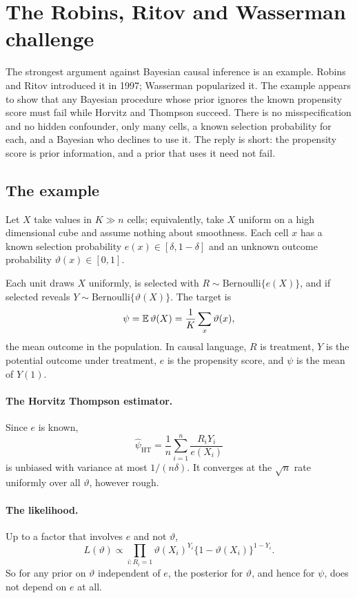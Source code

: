 \section{The Robins, Ritov and Wasserman challenge}\label{sec:rrw}

The strongest argument against Bayesian causal inference is an example. Robins and Ritov introduced it in 1997; Wasserman popularized it. The example appears to show that any Bayesian procedure whose prior ignores the known propensity score must fail while Horvitz and Thompson succeed. There is no misspecification and no hidden confounder, only many cells, a known selection probability for each, and a Bayesian who declines to use it. The reply is short: the propensity score is prior information, and a prior that uses it need not fail.

\subsection{The example}

Let $X$ take values in $K \gg n$ cells; equivalently, take $X$ uniform on a high dimensional cube and assume nothing about smoothness. Each cell $x$ has a known selection probability $e(x) \in [\delta, 1 - \delta]$ and an unknown outcome probability $\vartheta(x) \in [0,1]$.

Each unit draws $X$ uniformly, is selected with $R \sim \mathrm{Bernoulli}\{e(X)\}$, and if selected reveals $Y \sim \mathrm{Bernoulli}\{\vartheta(X)\}$. The target is
\[
\psi = \mathbb{E}\,\vartheta(X) = \frac{1}{K}\sum_{x} \vartheta(x),
\]
the mean outcome in the population. In causal language, $R$ is treatment, $Y$ is the potential outcome under treatment, $e$ is the propensity score, and $\psi$ is the mean of $Y(1)$.

\paragraph{The Horvitz Thompson estimator.} Since $e$ is known,
\[
\hat\psi_{\mathrm{HT}} = \frac{1}{n}\sum_{i=1}^n \frac{R_i Y_i}{e(X_i)}
\]
is unbiased with variance at most $1/(n\delta)$. It converges at the $\sqrt{n}$ rate uniformly over all $\vartheta$, however rough.

\paragraph{The likelihood.} Up to a factor that involves $e$ and not $\vartheta$,
\[
L(\vartheta) \propto \prod_{i: R_i = 1} \vartheta(X_i)^{Y_i}\{1 - \vartheta(X_i)\}^{1 - Y_i}.
\]
So for any prior on $\vartheta$ independent of $e$, the posterior for $\vartheta$, and hence for $\psi$, does not depend on $e$ at all.

